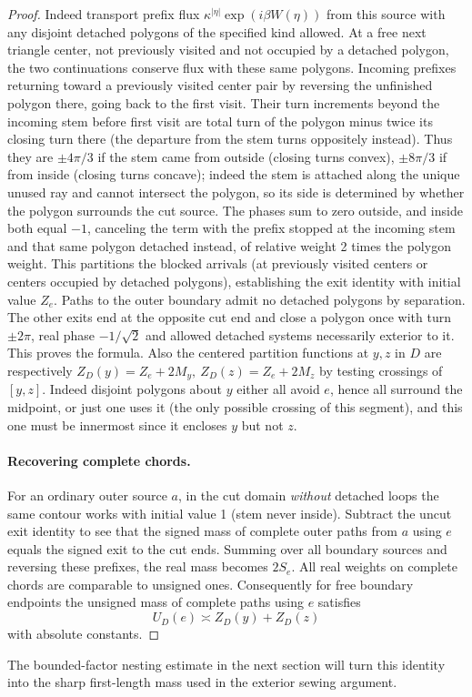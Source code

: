 \begin{proof}
Indeed transport prefix flux \(\kappa^{|\eta|}\exp(i\beta W(\eta))\) from this source with any disjoint detached polygons of the specified kind allowed. At a free next triangle center, not previously visited and not occupied by a detached polygon, the two continuations conserve flux with these same polygons. Incoming prefixes returning toward a previously visited center pair by reversing the unfinished polygon there, going back to the first visit. Their turn increments beyond the incoming stem before first visit are total turn of the polygon minus twice its closing turn there (the departure from the stem turns oppositely instead). Thus they are \(\pm4\pi/3\) if the stem came from outside (closing turns convex), \(\pm8\pi/3\) if from inside (closing turns concave); indeed the stem is attached along the unique unused ray and cannot intersect the polygon, so its side is determined by whether the polygon surrounds the cut source. The phases sum to zero outside, and inside both equal \(-1\), canceling the term with the prefix stopped at the incoming stem and that same polygon detached instead, of relative weight 2 times the polygon weight. This partitions the blocked arrivals (at previously visited centers or centers occupied by detached polygons), establishing the exit identity with initial value \(Z_e\). Paths to the outer boundary admit no detached polygons by separation. The other exits end at the opposite cut end and close a polygon once with turn \(\pm2\pi\), real phase \(-1/\sqrt2\) and allowed detached systems necessarily exterior to it. This proves the formula. Also the centered partition functions at \(y,z\) in \(D\) are respectively \(Z_D(y)=Z_e+2M_y,\ Z_D(z)=Z_e+2M_z\) by testing crossings of \([y,z]\). Indeed disjoint polygons about \(y\) either all avoid \(e\), hence all surround the midpoint, or just one uses it (the only possible crossing of this segment), and this one must be innermost since it encloses \(y\) but not \(z\).

\paragraph{Recovering complete chords.}
For an ordinary outer source \(a\), in the cut domain \emph{without} detached loops the same contour works with initial value 1 (stem never inside). Subtract the uncut exit identity to see that the signed mass of complete outer paths from \(a\) using \(e\) equals the signed exit to the cut ends. Summing over all boundary sources and reversing these prefixes, the real mass becomes \(2S_e\). All real weights on complete chords are comparable to unsigned ones. Consequently for free boundary endpoints the unsigned mass of complete paths using \(e\) satisfies
\[
 U_D(e)\asymp Z_D(y)+Z_D(z)
\]
with absolute constants.
\end{proof}

The bounded-factor nesting estimate in the next section will turn this identity into the sharp first-length mass used in the exterior sewing argument.
